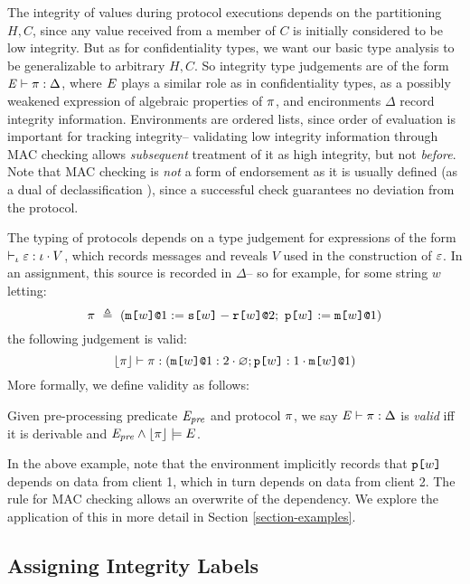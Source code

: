 \ipjfig

The integrity of values during protocol executions depends on the
partitioning $H,C$, since any value received from a member of $C$ is
initially considered to be low integrity. But as for confidentiality
types, we want our basic type analysis to be generalizable to
arbitrary $H,C$. So integrity type judgements are of the form
$\mathit{E} \vdash \pi : \Delta$, where $\mathit{E}$ plays a similar role as in
confidentiality types, as a possibly weakened expression of algebraic
properties of $\pi$, and encironments $\Delta$ record integrity
information. Environments are ordered lists, since order of evaluation
is important for tracking integrity-- validating low integrity
information through MAC checking allows \emph{subsequent} treatment of
it as high integrity, but not \emph{before}. Note that MAC checking is
\emph{not} a form of endorsement as it is usually defined (as a dual
of declassification \cite{sabelfeld2009declassification}), since a
successful check guarantees no deviation from the protocol.

The typing of protocols depends on a type judgement for expressions
of the form $\vdash_{\iota} \varepsilon : \iota \cdot V$, which records
messages and reveals $V$ used in the construction of $\varepsilon$.
In an assignment, this source is recorded in $\Delta$-- so for
example, for some string $w$ letting:
$$
\prog\ \defeq\ (\xassign{\mx{w}{1}}{\secret{w} - \flip{w}}{2};\ \rvl{w} := \mx{w}{1})
$$
the following judgement is valid:
$$
\lfloor \pi \rfloor \vdash \pi : (\texttt{m[}w\texttt{]}\texttt{@}1 : 2 \cdot \varnothing; \texttt{p[}w\texttt{]} : 1 \cdot \texttt{m[}w\texttt{]}\texttt{@}1)
$$
More formally, we define validity as follows:
\begin{definition}
  Given pre-processing predicate $\mathit{E}_{\mathit{pre}}$ and protocol $\pi$, 
  we say $\mathit{E} \vdash \pi : \Delta$ is \emph{valid}
  iff it is derivable and $\mathit{E}_{\mathit{pre}} \wedge \lfloor \pi \rfloor \models E$.
\end{definition}

In the above example, note that the environment implicitly records
that $\texttt{p[}w\texttt{]}$ depends on data from client 1, which in turn
depends on data from client 2. The rule for MAC
checking allows an overwrite of the dependency. We explore
the application of this in more detail in Section
\ref{section-examples}.

\cheatjfig

\subsection{Assigning Integrity Labels}

